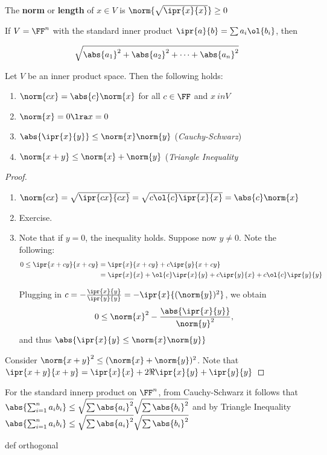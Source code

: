 \documentclass[11pt]{scrartcl}
\begin{document}
\begin{definition}
  \hfill
The \textbf{norm} or \textbf{length} of $x\in V$ is $\norm{\sqrt{\ipr{x}{x}}} \geq 0$
\end{definition}
\begin{example}

  If $V = \FF^n$ with the standard inner product
  $\ipr{a}{b} = \sum a_i\ol{b_{i}}$, then

  \begin{equation*}
    \sqrt{\abs{a_1}^2+\abs{a_2}^2+\cdots + \abs{a_n}^2}
  \end{equation*}
\end{example}

\begin{theorem}
  Let $V$ be an inner product space. Then the following holds:

  \begin{enumerate}[label=\alph*)]
  \item $\norm{cx} = \abs{c}\norm{x}$ for all $c \in \FF$ and $x\ in V$
  \item $\norm{x} = 0 \lra x = 0$
  \item $\abs{\ipr{x}{y}}\leq\norm{x}\norm{y}$ (\textit{Cauchy-Schwarz})
  \item $\norm{x+y}\leq \norm{x} + \norm{y}$ (\textit{Triangle Inequality}
  \end{enumerate}
\end{theorem}

\begin{proof}
  \begin{enumerate}[label=\alph*)]
  \item$\norm{cx} = \sqrt{\ipr{cx}{cx}} = \sqrt{c\ol{c}\ipr{x}{x}} = \abs{c}\norm{x}$
  \item Exercise.
  \item Note that if $y=0$, the inequality holds. Suppose now
    $y\neq 0$. Note the following:
    \begin{align}
      0\leq \ipr{x+cy}{x+cy} &= \ipr{x}{x+cy}+ c \ipr{y}{x+cy}\\
      &= \ipr{x}{x} + \ol{c}\ipr{x}{y}+c\ipr{y}{x}+ c\ol{c}\ipr{y}{y}
    \end{align}

    Plugging in
    $c = -\frac{\ipr{x}{y}}{\ipr{y}{y}} = -\ipr{x}{(\norm{y})^{2}}$,
    we obtain
    \begin{equation*}
      0\leq \norm{x}^{2} - \frac{\abs{\ipr{x}{y}}}{\norm{y}^{2}},
    \end{equation*}
    and thus $\abs{\ipr{x}{y}\leq \norm{x}\norm{y}}$
  \end{enumerate}
\item Consider $\norm{x+y}^2 \leq (\norm{x}+\norm{y})^2$. Note that
  $\ipr{x+y}{x+y} = \ipr{x}{x}+2\Re{\ipr{x}{y}}+\ipr{y}{y}$
\end{proof}

For the standard innerp product on $\FF^n$, from Cauchy-Schwarz it
follows that
$\abs{\sum_{i=1}^na_ib_i} \leq \sqrt{\sum \abs{a_i}^2}\sqrt{\sum
  \abs{b_i}^2}$ and by Triangle Inequality$\abs{\sum_{i=1}^na_ib_i} \leq \sqrt{\sum \abs{a_i}^2}\sqrt{\sum
  \abs{b_i}^2}$

def orthogonal
\end{document}
